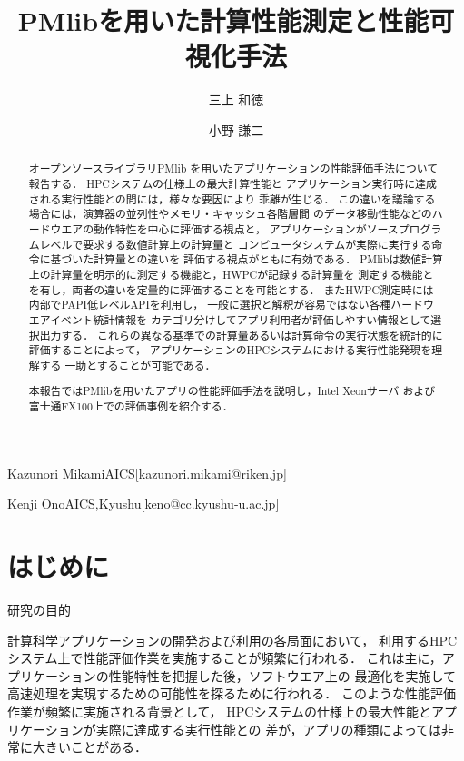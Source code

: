 \documentclass[submit,techrep,noauthor]{ipsj}
\begin{document}
\title{PMlibを用いた計算性能測定と性能可視化手法}


\author{三上 和徳}{Kazunori Mikami}{AICS}[kazunori.mikami@riken.jp]
\author{小野 謙二}{Kenji Ono}{AICS,Kyushu}[keno@cc.kyushu-u.ac.jp]

\begin{abstract}
オープンソースライブラリPMlib
を用いたアプリケーションの性能評価手法について報告する．
HPCシステムの仕様上の最大計算性能と
アプリケーション実行時に達成される実行性能との間には，様々な要因により
乖離が生じる．
この違いを議論する場合には，演算器の並列性やメモリ・キャッシュ各階層間
のデータ移動性能などのハードウエアの動作特性を中心に評価する視点と，
アプリケーションがソースプログラムレベルで要求する数値計算上の計算量と
コンピュータシステムが実際に実行する命令に基づいた計算量との違いを
評価する視点がともに有効である．
PMlibは数値計算上の計算量を明示的に測定する機能と，HWPCが記録する計算量を
測定する機能とを有し，両者の違いを定量的に評価することを可能とする．
またHWPC測定時には内部でPAPI低レベルAPIを利用し，
一般に選択と解釈が容易ではない各種ハードウエアイベント統計情報を
カテゴリ分けしてアプリ利用者が評価しやすい情報として選択出力する．
%
%
これらの異なる基準での計算量あるいは計算命令の実行状態を統計的に
評価することによって，
アプリケーションのHPCシステムにおける実行性能発現を理解する
一助とすることが可能である．

本報告ではPMlibを用いたアプリの性能評価手法を説明し，Intel Xeonサーバ
および富士通FX100上での評価事例を紹介する．
\end{abstract}

\maketitle


\section{はじめに}
研究の目的

計算科学アプリケーションの開発および利用の各局面において，
利用するHPCシステム上で性能評価作業を実施することが頻繁に行われる．
これは主に，アプリケーションの性能特性を把握した後，ソフトウエア上の
最適化を実施して高速処理を実現するための可能性を探るために行われる．
このような性能評価作業が頻繁に実施される背景として，
HPCシステムの仕様上の最大性能とアプリケーションが実際に達成する実行性能との
差が，アプリの種類によっては非常に大きいことがある．
\end{document}
